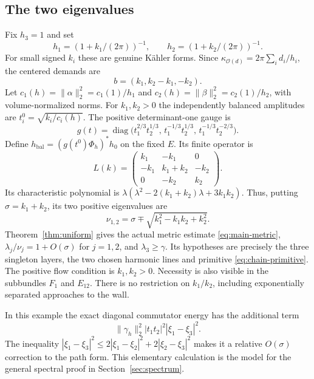 \documentclass[11pt]{amsart}
\theoremstyle{definition}
\theoremstyle{remark}
\newcommand{\cO}{\mathcal O}
\newcommand{\diag}{\operatorname{diag}}
\begin{document}
\subsection{The two eigenvalues}
Fix $h_3=1$ and set
\[
 h_1=(1+k_1/(2\pi))^{-1},\qquad
 h_2=(1+k_2/(2\pi))^{-1}.
\]
For small signed $k_i$ these are genuine K\"ahler forms. Since
$\kappa_{\cO(d)}=2\pi\sum_i d_i/h_i$, the centered demands are
\[
 b=(k_1,k_2-k_1,-k_2).
\]
Let $c_1(h)=\|\alpha\|_2^2=c_1(1)/h_1$ and
$c_2(h)=\|\beta\|_2^2=c_2(1)/h_2$, with volume-normalized norms.
For $k_1,k_2>0$ the independently balanced amplitudes are
$t_i^0=\sqrt{k_i/c_i(h)}$. The positive determinant-one gauge is
\[
 g(t)=\diag\bigl(t_1^{2/3}t_2^{1/3},\,
 t_1^{-1/3}t_2^{1/3},\,t_1^{-1/3}t_2^{-2/3}\bigr).
\]
Define $h_{\mathrm{bal}}=(g(t^0)\Phi_h)^*h_0$ on the fixed $E$.
Its finite operator is
\begin{equation}\label{eq:chain-laplacian}
 L(k)=\begin{pmatrix}
 k_1&-k_1&0\\-k_1&k_1+k_2&-k_2\\0&-k_2&k_2
 \end{pmatrix}.
\end{equation}
Its characteristic polynomial is
$\lambda(\lambda^2-2(k_1+k_2)\lambda+3k_1k_2)$. Thus, putting
$\sigma=k_1+k_2$, its two positive eigenvalues are
\begin{equation}\label{eq:chain-eigenvalues}
 \nu_{1,2}=\sigma\mp\sqrt{k_1^2-k_1k_2+k_2^2}.
\end{equation}
Theorem~\ref{thm:uniform} gives the actual metric estimate
\eqref{eq:main-metric}, $\lambda_j/\nu_j=1+O(\sigma)$ for $j=1,2$,
and $\lambda_3\ge\gamma$. Its hypotheses are precisely the three
singleton layers, the two chosen harmonic lines and primitive
\eqref{eq:chain-primitive}. The positive flow condition is $k_1,k_2>0$.
Necessity is also visible in the subbundles $F_1$ and $E_{12}$.
There is no restriction on $k_1/k_2$, including exponentially separated
approaches to the wall.

In this example the exact diagonal commutator energy has the additional
term
\[
 \|\gamma_h\|_2^2|t_1t_2|^2|\xi_1-\xi_3|^2.
\]
The inequality $|\xi_1-\xi_3|^2\le2|\xi_1-\xi_2|^2+
2|\xi_2-\xi_3|^2$ makes it a relative $O(\sigma)$ correction to the
path form. This elementary calculation is the model for the general
spectral proof in Section~\ref{sec:spectrum}.
\end{document}
